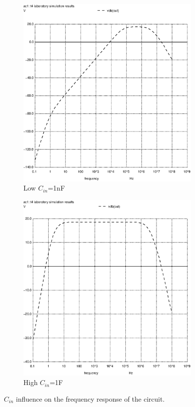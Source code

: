 \begin{figure}[h]
\centering
\begin{subfigure}{.5\textwidth}
    \centering
    \includegraphics[scale=0.33]{Images/couplingsmall.ps}
    \caption{Low $C_{in}$=1nF}
\end{subfigure}%
\begin{subfigure}{.5\textwidth}
    \centering
    \includegraphics[scale=0.33]{Images/couplingbig.ps}
    \caption{High $C_{in}$=1F}
\end{subfigure}
\caption{$C_{in}$ influence on the frequency response of the circuit.}
\label{fig_coupling}
\end{figure}

